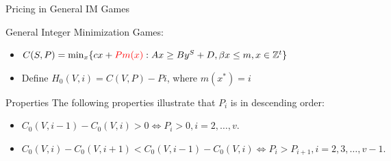\documentclass[14pt]{beamer}
\begin{document}
\begin{frame}{Pricing in General IM Games}
	\begin{definition}
	\small
	\justifying
	General Integer Minimization Games:\\
	\begin{itemize}
	\justifying
		\item
		$C(S,P)= \mathop{\min}_{x} \{ cx+\textcolor{red}{Pm(x)}: Ax \geq By^S+D, {\beta}x \leq m, x \in \mathbb{Z}^{t} \}$
		\vspace{2pt}
		\item Define $H_0(V,i) = C(V,P)- Pi$, where $m(x^*) = i$
	\end{itemize}
	\end{definition}

	\begin{block}
		{Properties}
		\small
		The following properties illustrate that $P_i$ is in descending order:
		\begin{itemize}
			\justifying
				\item $C_0(V,i-1)- C_0(V,i) > 0 \Leftrightarrow P_i > 0, i=2,\ldots,v.$
				\item $C_0 (V,i) - C_0 (V,i+1) < C_0 (V,i-1) - C_0 (V,i) \Leftrightarrow P_i > P_{i+1} , i=2,3,\ldots,v-1.$
				\vspace{3pt}
		\end{itemize}
	\end{block}
\end{frame}
\end{document}
